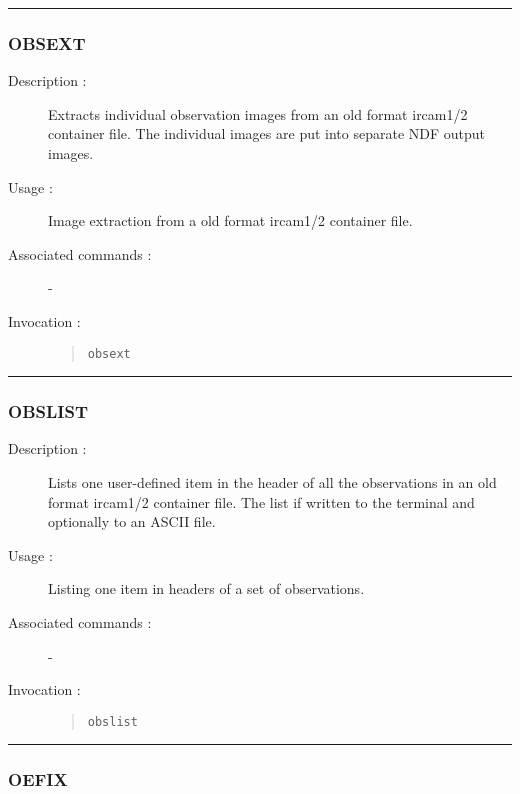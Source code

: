 \hrule
\subsubsection*{\label{OBSEXT}OBSEXT}

\begin{description}

\item[Description :] Extracts individual observation images from an old
format {\sc ircam1/2} container file.  The individual images are put
into separate NDF output images.

\item[Usage :] Image extraction from a old format {\sc ircam1/2}
container file.

\item[Associated commands :] -
\item[Invocation :]

\begin{quote}{\tt  obsext }\end{quote}

\end{description}

\hrule
\subsubsection*{\label{OBSLIST}OBSLIST}

\begin{description}

\item[Description :] Lists one user-defined item in the header of all
the observations in an old format {\sc ircam1/2} container file.  The
list if written to the terminal and optionally to an ASCII file.

\item[Usage :] Listing one item in headers of a set of observations.
\item[Associated commands :] -
\item[Invocation :]

\begin{quote}{\tt  obslist }\end{quote}

\end{description}

\hrule
\subsubsection*{\label{OEFIX}OEFIX}

